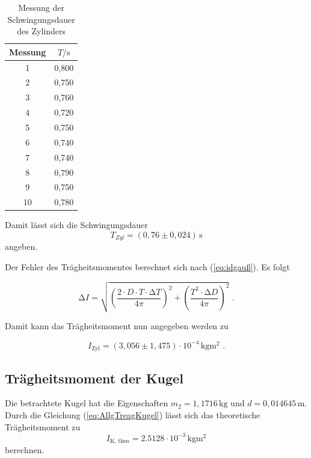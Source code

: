 \begin{table}
  \centering
  \caption{Messung der Schwingungsdauer des Zylinders}
  \label{tab:SchwingungsdauerZylinder}
  \begin{tabular}{c c}
    \toprule
     Messung &  $T / \unit\second$ \\
    \midrule
              1 &        0,800 \\
              2 &        0,750 \\
              3 &        0,760 \\
              4 &        0,720 \\
              5 &        0,750 \\
              6 &        0,740 \\
              7 &        0,740 \\
              8 &        0,790 \\
              9 &        0,750 \\
             10 &        0,780 \\
    \bottomrule
  \end{tabular}
\end{table}

Damit lässt sich die Schwingungsdauer
\begin{equation*}
  T_{Zyl} = (0,76 \pm 0,024) \, \unit{\second}
\end{equation*}
angeben.

Der Fehler des Trägheitsmomentes berechnet sich nach (\ref{eq:idgauß}). Es folgt

\begin{equation*}
  \increment I = \sqrt{\left( \frac{2 \cdot D \cdot  T \cdot \increment T}{4 \pi} \right)^2 + \left( \frac{T^2 \cdot \increment D}{4 \pi}\right)^2}
  \text{ .}
\end{equation*}


Damit kann das Trägheitsmoment nun angegeben werden zu

\begin{equation*}
  I_{\text{Zyl}} = (3,056 \pm 1,475) \cdot 10^{-4} \, \unit{\kilo\gram\meter\squared} \text{ .}
\end{equation*}

\subsection{Trägheitsmoment der Kugel}\label{sec:TreagKugel}

Die betrachtete Kugel hat die Eigenschaften $m_2 = 1,1716 \, \unit{\kilo\gram}$ und $d = 0,014645 \, \unit{\meter}$.
Durch die Gleichung (\ref{eq:AllgTreagKugel}) lässt sich das theoretische Trägheitsmoment zu 
\begin{equation*}
  I_{\text{K, theo}} = 2.5128 \cdot 10^{-3} \, \unit{\kilo\gram\meter\squared}
\end{equation*}
berechnen.

